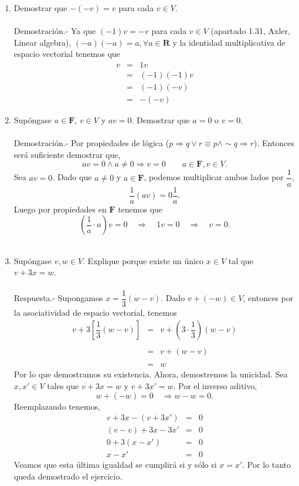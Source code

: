 \begin{enumerate}[\bfseries 1.]

    \item Demostrar que $-(-v)=v$ para cada $v\in V$.\\\\
	Demostración.-\; Ya que $(-1)v=-v$ para cada $v\in V$ (apartado 1.31, Axler, Linear algebra), $(-a)(-a)=a, \forall a \in \textbf{R}$ y la identidad multiplicativa de espacio vectorial tenemos que 
	$$\begin{array}{rcl}
	v &=& 1v \\
	&=& (-1)(-1)v \\
	&=& (-1)(-v) \\
	&=& -(-v)
	\end{array}$$
	\vspace{0.5cm}

    \item Supóngase $a\in \textbf{F}$, $v\in V$ y $av=0$. Demostrar que $a=0$ o $v=0$.\\\\
	Demostración.-\; Por propiedades de lógica ($p \Rightarrow q \lor r \equiv p\land \sim q \Rightarrow r$). Entonces será suficiente demostrar que,
	$$av=0 \land a\neq 0 \Rightarrow v=0 \qquad a\in \textbf{F}, v\in V.$$
	Sea $av=0$. Dado que $a\neq 0$ y $a\in \textbf{F}$, podemos multiplicar ambos lados por $\dfrac{1}{a}$,
	$$\dfrac{1}{a}(av) = 0\dfrac{1}{a}.$$
	Luego por propiedades en $\textbf{F}$ tenemos que
	$$\left(\dfrac{1}{a}\cdot a\right)v=0\quad \Rightarrow \quad 1v=0 \quad \Rightarrow \quad v=0.$$\\

    \item Supóngase $v,w\in V$. Explique porque existe un único $x\in V$ tal que $v+3x=w$.\\\\
	Respuesta.-\; Supongamos $x=\dfrac{1}{3}(w-v)$. Dado $v+(-w)\in V$, entonces  por la asociatividad de espacio vectorial, tenemos
	$$\begin{array}{rcl}
	    v+3\left[\dfrac{1}{3}(w-v)\right] &=& v + \left(3\cdot\dfrac{1}{3}\right)(w-v)\\\\
	    &=& v+(w-v)\\\\
	    &=& w
	\end{array}$$
	Por lo que demostramos su existencia. Ahora, demostremos la unicidad. Sea $x,x'\in V$ tales que $v+3x=w$ y $v+3x'=w$. Por el inverso aditivo, 
	$$w+(-w)=0 \quad \Rightarrow w-w=0.$$
	Reemplazando tenemos,
	$$\begin{array}{rcl}
	    v+3x-(v+3x') &=&0\\
	    (v-v) + 3x-3x' &=&0\\
	    0+3(x-x')&=&0\\
	    x-x'&=&0
	\end{array}$$
	Veamos que esta última igualdad se cumplirá si y sólo si $x=x'$. Por lo tanto queda demostrado el ejercicio.\\\\



\end{enumerate}
